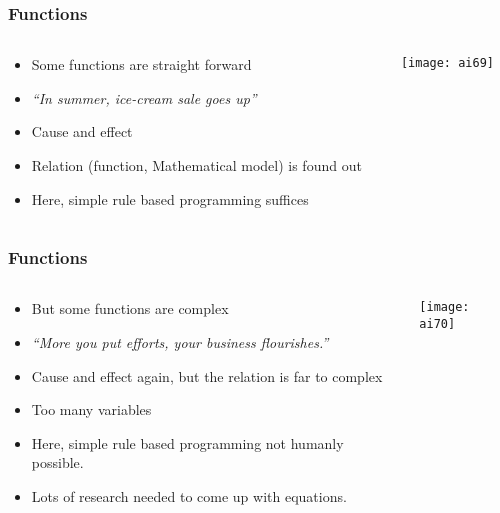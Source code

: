 \begin{frame}[fragile]\frametitle{Functions}

\begin{columns}
    \begin{column}[T]{0.6\linewidth}

\begin{itemize}
\item Some functions are straight forward
\item {\em ``In summer, ice-cream sale goes up''}
\item Cause and effect
\item Relation (function, Mathematical model) is found out
\item Here, simple rule based programming suffices
\end{itemize}

    \end{column}
    \begin{column}[T]{0.4\linewidth}

			\begin{center}
			\texttt{[image: ai69]}
			\end{center}
			
    \end{column}
  \end{columns}
  

\end{frame}

\begin{frame}[fragile]\frametitle{Functions}

\begin{columns}
    \begin{column}[T]{0.6\linewidth}

\begin{itemize}
\item But some functions are complex
\item {\em ``More you put efforts, your business flourishes.''}
\item Cause and effect again, but the relation is far to complex
\item Too many variables
\item Here, simple rule based programming not humanly possible.
\item Lots of research needed to come up with equations.
\end{itemize}

    \end{column}
    \begin{column}[T]{0.4\linewidth}

			\begin{center}
			\texttt{[image: ai70]}
			\end{center}
			
    \end{column}
  \end{columns}
  
  

\end{frame}

